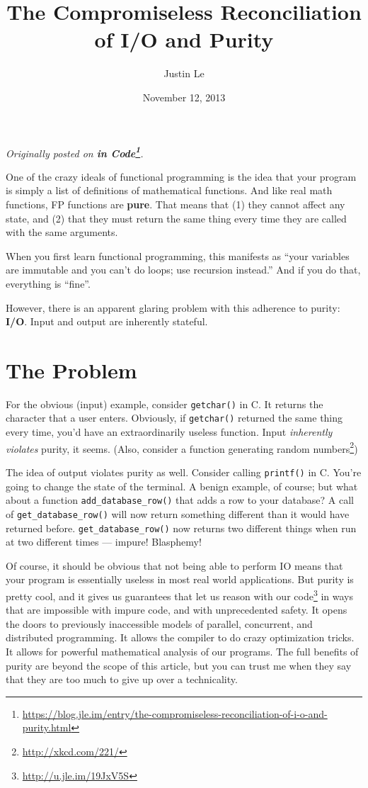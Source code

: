 \documentclass[]{article}
\title{The Compromiseless Reconciliation of I/O and Purity}
\author{Justin Le}
\date{November 12, 2013}
\renewcommand{\href}[2]{#2\footnote{\url{#1}}}
\begin{document}
\maketitle

\emph{Originally posted on
\textbf{\href{https://blog.jle.im/entry/the-compromiseless-reconciliation-of-i-o-and-purity.html}{in
Code}}.}

One of the crazy ideals of functional programming is the idea that your program
is simply a list of definitions of mathematical functions. And like real math
functions, FP functions are \textbf{pure}. That means that (1) they cannot
affect any state, and (2) that they must return the same thing every time they
are called with the same arguments.

When you first learn functional programming, this manifests as ``your variables
are immutable and you can't do loops; use recursion instead.'' And if you do
that, everything is ``fine''.

However, there is an apparent glaring problem with this adherence to purity:
\textbf{I/O}. Input and output are inherently stateful.

\hypertarget{the-problem}{%
\section{The Problem}\label{the-problem}}

For the obvious (input) example, consider \texttt{getchar()} in C. It returns
the character that a user enters. Obviously, if \texttt{getchar()} returned the
same thing every time, you'd have an extraordinarily useless function. Input
\emph{inherently violates} purity, it seems. (Also, consider a
\href{http://xkcd.com/221/}{function generating random numbers})

The idea of output violates purity as well. Consider calling \texttt{printf()}
in C. You're going to change the state of the terminal. A benign example, of
course; but what about a function \texttt{add\_database\_row()} that adds a row
to your database? A call of \texttt{get\_database\_row()} will now return
something different than it would have returned before.
\texttt{get\_database\_row()} now returns two different things when run at two
different times --- impure! Blasphemy!

Of course, it should be obvious that not being able to perform IO means that
your program is essentially useless in most real world applications. But purity
is pretty cool, and it gives us guarantees that let us
\href{http://u.jle.im/19JxV5S}{reason with our code} in ways that are impossible
with impure code, and with unprecedented safety. It opens the doors to
previously inaccessible models of parallel, concurrent, and distributed
programming. It allows the compiler to do crazy optimization tricks. It allows
for powerful mathematical analysis of our programs. The full benefits of purity
are beyond the scope of this article, but you can trust me when they say that
they are too much to give up over a technicality.
\end{document}
